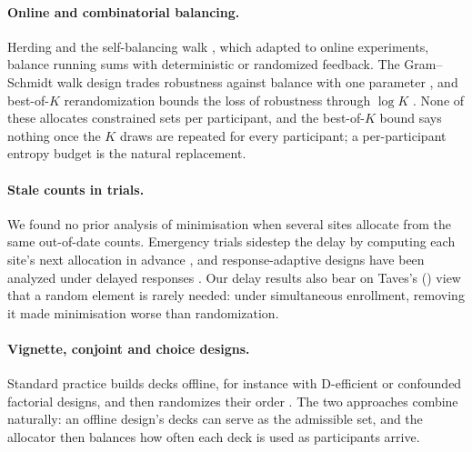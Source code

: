 \documentclass[11pt]{article}
\begin{document}
\paragraph{Online and combinatorial balancing.} Herding \citep{welling2009,chen2016} and the self-balancing walk \citep{alweiss2021}, which \citet{arbour2022} adapted to online experiments, balance running sums with deterministic or randomized feedback. The Gram--Schmidt walk design trades robustness against balance with one parameter \citep{harshaw2024}, and best-of-$K$ rerandomization bounds the loss of robustness through $\log K$ \citep{banerjee2020}. None of these allocates constrained sets per participant, and the best-of-$K$ bound says nothing once the $K$ draws are repeated for every participant; a per-participant entropy budget is the natural replacement.

\paragraph{Stale counts in trials.} We found no prior analysis of minimisation when several sites allocate from the same out-of-date counts. Emergency trials sidestep the delay by computing each site's next allocation in advance \citep{zhao2010}, and response-adaptive designs have been analyzed under delayed responses \citep{bai2002}. Our delay results also bear on Taves's (\citeyear{taves2010}) view that a random element is rarely needed: under simultaneous enrollment, removing it made minimisation worse than randomization.

\paragraph{Vignette, conjoint and choice designs.} Standard practice builds decks offline, for instance with D-efficient or confounded factorial designs, and then randomizes their order \citep{atzmuller2010,dulmer2016,su2020}. The two approaches combine naturally: an offline design's decks can serve as the admissible set, and the allocator then balances how often each deck is used as participants arrive.
\end{document}
